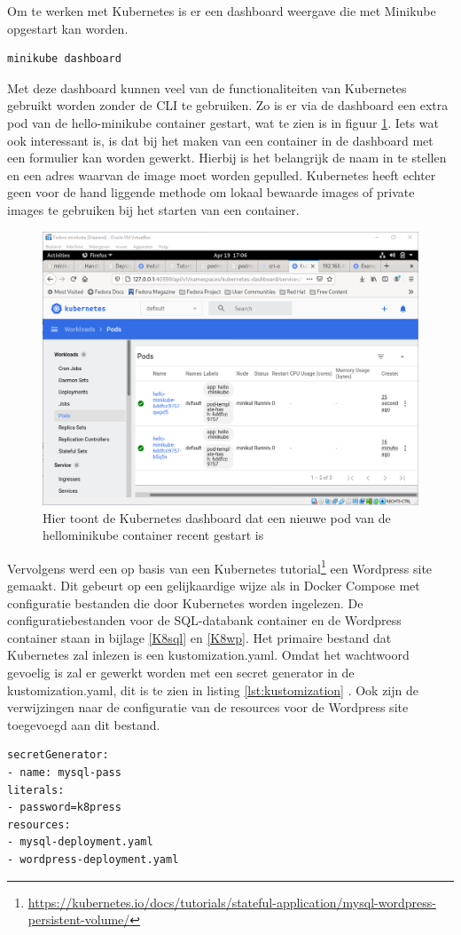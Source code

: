 Om te werken met Kubernetes is er een dashboard weergave die met Minikube opgestart kan worden.
\begin{verbatim}
minikube dashboard
\end{verbatim}
Met deze dashboard kunnen veel van de functionaliteiten van Kubernetes gebruikt worden zonder de CLI te gebruiken. Zo is er via de dashboard een extra pod van de hello-minikube container gestart, wat te zien is in figuur \ref{fig:kubenetesDash}. Iets wat ook interessant is, is dat bij het maken van een container in de dashboard met een formulier kan worden gewerkt. Hierbij is het belangrijk de naam in te stellen en een adres waarvan de image moet worden gepulled. Kubernetes heeft echter geen voor de hand liggende methode om lokaal bewaarde images of private images te gebruiken bij het starten van een container.
\begin{figure}[h]
    \includegraphics[width=\linewidth]{img/kubenetesDash.png}
    \caption[Het kubernetes Dashboard]{Hier toont de Kubernetes dashboard dat een nieuwe pod van de hellominikube container recent gestart is}
    \label{fig:kubenetesDash}
    \centering
\end{figure}

Vervolgens werd een op basis van een Kubernetes tutorial\footnote{\url{https://kubernetes.io/docs/tutorials/stateful-application/mysql-wordpress-persistent-volume/}} een Wordpress site gemaakt. Dit gebeurt op een gelijkaardige wijze als in Docker Compose met configuratie bestanden die door Kubernetes worden ingelezen. De configuratiebestanden voor de SQL-databank container en de Wordpress container staan in bijlage \ref{K8sql} en \ref{K8wp}. Het primaire bestand dat Kubernetes zal inlezen is een kustomization.yaml. Omdat het wachtwoord gevoelig is zal er gewerkt worden met een secret generator in de kustomization.yaml, dit is te zien in listing \ref{lst:kustomization} . Ook zijn de verwijzingen naar de configuratie van de resources voor de Wordpress site toegevoegd aan dit bestand.
\begin{lstlisting}[caption=inhoud van kustomization.yaml,label=lst:kustomization]
secretGenerator:
- name: mysql-pass
literals:
- password=k8press
resources:
- mysql-deployment.yaml
- wordpress-deployment.yaml
\end{lstlisting}

